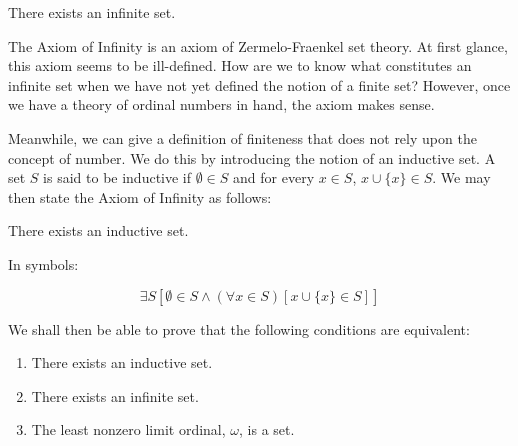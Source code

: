 \documentclass[12pt]{article}
\begin{document}
There exists an infinite set.

The Axiom of Infinity is an axiom of Zermelo-Fraenkel set theory.
At first glance, this axiom seems to be ill-defined.  How are we to know what
constitutes an infinite set when we have not yet defined the notion of a
finite set?  However, once we have a theory of ordinal numbers in hand, the axiom makes sense.

Meanwhile, we can give a definition of finiteness that does not rely upon
the concept of number.  We do this by introducing the notion of an inductive
set.  A set $S$ is said to be inductive if $\emptyset \in S$ 
and for every $x \in S$, $x \cup \{ x \} \in S$.  We may then state the 
Axiom of Infinity as follows:

There exists an inductive set.

In symbols:

\[
\exists S [\emptyset \in S \land (\forall x \in S)[x \cup \{ x \} \in S]]
\]

We shall then be able to prove that the following conditions are equivalent:
\begin{enumerate}
\item There exists an inductive set.
\item There exists an infinite set.
\item The least nonzero limit ordinal, $\omega$, is a set.
\end{enumerate}
\end{document}
